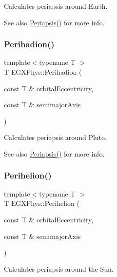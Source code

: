 Calculates periapsis around Earth. 

\begin{DoxySeeAlso}{See also}
\hyperlink{group___e_g_x_phys-_periapsis_ga4414ac75539371ec874a3d25cad6c9fe}{Periapsis()} for more info. 
\end{DoxySeeAlso}
\mbox{\label{group___e_g_x_phys-_periapsis_gafb16e46e55078b38604eef0d7c7c40c4}} 
\subsubsection{\texorpdfstring{Perihadion()}{Perihadion()}}
{\footnotesize\ttfamily template$<$typename T $>$ \\
T E\+G\+X\+Phys\+::\+Perihadion (\begin{DoxyParamCaption}\item[{const T \&}]{orbital\+Eccentricity,  }\item[{const T \&}]{semimajor\+Axis }\end{DoxyParamCaption})}



Calculates periapsis around Pluto. 

\begin{DoxySeeAlso}{See also}
\hyperlink{group___e_g_x_phys-_periapsis_ga4414ac75539371ec874a3d25cad6c9fe}{Periapsis()} for more info. 
\end{DoxySeeAlso}
\mbox{\label{group___e_g_x_phys-_periapsis_ga941d285e3a0b48ada9c9f60925ff63c2}} 
\subsubsection{\texorpdfstring{Perihelion()}{Perihelion()}}
{\footnotesize\ttfamily template$<$typename T $>$ \\
T E\+G\+X\+Phys\+::\+Perihelion (\begin{DoxyParamCaption}\item[{const T \&}]{orbital\+Eccentricity,  }\item[{const T \&}]{semimajor\+Axis }\end{DoxyParamCaption})}



Calculates periapsis around the Sun. 

